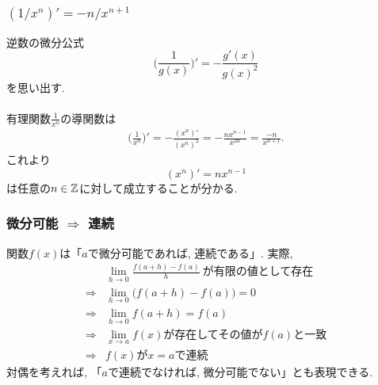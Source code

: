 \begin{frame}
\frametitle{$(1/x^n)'=-n/x^{n+1}$}

逆数の微分公式
$$
\Big(\frac{1}{g(x)}\Big)'=-\frac{g'(x)}{g(x)^2}
$$
を思い出す. \\
\ \\

有理関数$\frac{1}{x^n}$の導関数は
\begin{align*}
\Big(\frac{1}{x^n}\Big)' = -\frac{(x^n)'}{(x^n)^2}=-\frac{nx^{n-1}}{x^{2n}}=\frac{-n}{x^{n+1}}. 
\end{align*}
これより
$$
(x^n)'=nx^{n-1}
$$
は任意の$n \in \mathbb{Z}$に対して成立することが分かる. 

\end{frame}





\begin{frame}
\frametitle{微分可能 $\Rightarrow$ 連続}

関数$f(x)$は「$a$で微分可能であれば, 連続である」. 
実際, 
\begin{align*}
& \lim_{h\to 0} \frac{f(a+h)-f(a)}{h} \  \text{が有限の値として存在}\\ 
\Longrightarrow & \lim_{h\to 0} \big(f(a+h)-f(a)\big)=0 \\
\Longrightarrow &  \lim_{h\to 0} f(a+h)= f(a) \\
\Longrightarrow & \text{$\lim_{ x \to a} f(x)$が存在してその値が$f(a)$と一致} \\
\Longrightarrow & \text{$f(x)$が$x=a$で連続}
\end{align*}
対偶を考えれば, 「$a$で連続でなければ, 微分可能でない」とも表現できる.  


\end{frame}




